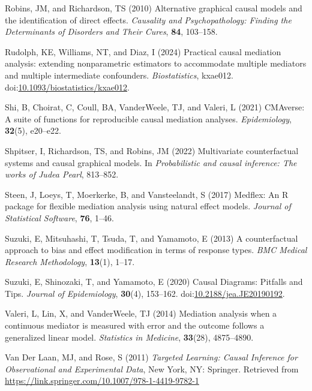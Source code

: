 \documentclass[
  single column]{article}
\newlength{\cslhangindent}
\newenvironment{CSLReferences}[2] %
 {\begin{list}{}{%
  \setlength{\itemindent}{0pt}
  \setlength{\leftmargin}{0pt}
  \setlength{\parsep}{0pt}
  \ifodd #1
   \setlength{\leftmargin}{\cslhangindent}
   \setlength{\itemindent}{-1\cslhangindent}
  \fi
  \setlength{\itemsep}{#2\baselineskip}}}
 {\end{list}}
\begin{document}
\begin{CSLReferences}{1}{0}
Robins, JM, and Richardson, TS (2010) Alternative graphical causal
models and the identification of direct effects. \emph{Causality and
Psychopathology: Finding the Determinants of Disorders and Their Cures},
\textbf{84}, 103--158.

Rudolph, KE, Williams, NT, and Diaz, I (2024) {Practical causal
mediation analysis: extending nonparametric estimators to accommodate
multiple mediators and multiple intermediate confounders}.
\emph{Biostatistics}, kxae012.
doi:\href{https://doi.org/10.1093/biostatistics/kxae012}{10.1093/biostatistics/kxae012}.

Shi, B, Choirat, C, Coull, BA, VanderWeele, TJ, and Valeri, L (2021)
CMAverse: A suite of functions for reproducible causal mediation
analyses. \emph{Epidemiology}, \textbf{32}(5), e20--e22.

Shpitser, I, Richardson, TS, and Robins, JM (2022) Multivariate
counterfactual systems and causal graphical models. In
\emph{Probabilistic and causal inference: The works of {J}udea {P}earl},
813--852.

Steen, J, Loeys, T, Moerkerke, B, and Vansteelandt, S (2017) Medflex: An
{R} package for flexible mediation analysis using natural effect models.
\emph{Journal of Statistical Software}, \textbf{76}, 1--46.

Suzuki, E, Mitsuhashi, T, Tsuda, T, and Yamamoto, E (2013) A
counterfactual approach to bias and effect modification in terms of
response types. \emph{BMC Medical Research Methodology}, \textbf{13}(1),
1--17.

Suzuki, E, Shinozaki, T, and Yamamoto, E (2020) Causal Diagrams:
Pitfalls and Tips. \emph{Journal of Epidemiology}, \textbf{30}(4),
153--162.
doi:\href{https://doi.org/10.2188/jea.JE20190192}{10.2188/jea.JE20190192}.

Valeri, L, Lin, X, and VanderWeele, TJ (2014) Mediation analysis when a
continuous mediator is measured with error and the outcome follows a
generalized linear model. \emph{Statistics in Medicine},
\textbf{33}(28), 4875--4890.

Van Der Laan, MJ, and Rose, S (2011) \emph{Targeted Learning: Causal
Inference for Observational and Experimental Data}, New York, NY:
Springer. Retrieved from
\url{https://link.springer.com/10.1007/978-1-4419-9782-1}


\end{CSLReferences}
\end{document}
